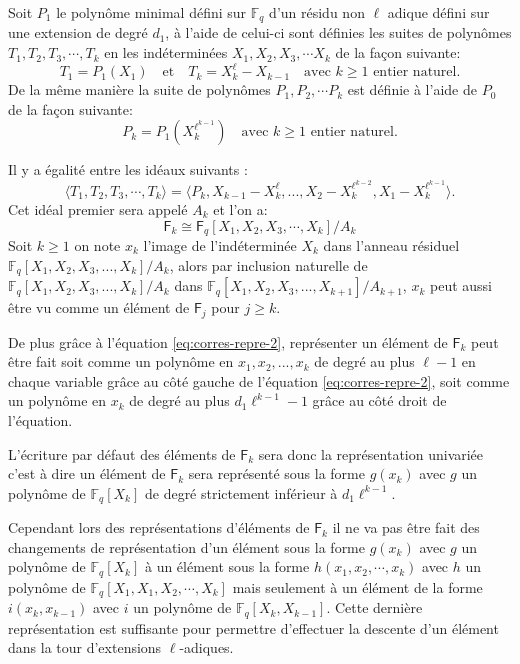 \documentclass[10pt,a4paper]{book}
\theoremstyle{plain}
\theoremstyle{definition}
\theoremstyle{definition}
\theoremstyle{definition}
\theoremstyle{definition}
\theoremstyle{definition}
\theoremstyle{remark}
\theoremstyle{remark}
\theoremstyle{definition}
\begin{document}
Soit $P_1$ le polynôme minimal défini sur $\mathbb{F}_q$ d'un résidu non $\ell$ adique défini sur une extension de degré $d_1$, à l'aide de celui-ci sont définies les suites de polynômes $T_1,T_2,T_3,\cdots, T_k$ en les indéterminées $X_1,X_2,X_3, \cdots X_k$ de la façon suivante:
\[
T_1=P_1(X_1) \quad \text{et} \quad T_k=X_k^{\ell}-X_{k-1} \quad \text{avec $k \geqslant 1$ entier naturel.}
\]  De la même manière la suite de polynômes $P_1,P_2, \cdots P_k$ est définie à l'aide de $P_0$ de la façon suivante:
\[
P_k=P_1(X_k^{\ell^{k-1}}) \quad \text{avec $k \geqslant 1$ entier naturel.} 
\]

Il y a égalité entre les idéaux suivants :
\begin{equation}
\label{eq:corres-repre-2}
\langle T_1, T_2, T_3, \cdots, T_k \rangle = \langle P_k, X_{k-1}-X_k^{\ell}, ..., X_2-X_{k}^{\ell^{k-2}}, X_1-X_k^{\ell^{k-1}} \rangle.
\end{equation}
Cet idéal premier sera appelé $A_k$ et l'on a:
\[
\mathsf{F}_k \cong \mathsf{F}_q[X_1,X_2,X_3,\cdots,X_k]/A_k
\]
Soit $k \geqslant 1$  on note $x_k$ l'image de l'indéterminée $X_k$ dans l'anneau résiduel $\mathbb{F}_q[X_1,X_2,X_3, ...,X_k]/A_k$, alors par inclusion naturelle de $\mathbb{F}_q[X_1,X_2,X_3, ...,X_k]/A_k$ dans $\mathbb{F}_q[X_1,X_2,X_3, ...,X_{k+1}]/A_{k+1}$, $x_k$ peut aussi être vu comme un élément de $\mathsf{F}_{j}$ pour $j \geqslant k$.

De plus grâce à l'équation \eqref{eq:corres-repre-2}, représenter un élément de $\mathsf{F}_k$ peut être fait soit comme un polynôme en $x_1,x_2, ..., x_k$ de degré au plus $\ell-1$ en chaque variable grâce au côté gauche de l'équation \eqref{eq:corres-repre-2}, soit comme un polynôme en $x_k$ de degré au plus $d_1\ell^{k-1}-1$ grâce au côté droit de l'équation.

L'écriture par défaut des éléments de $\mathsf{F}_k$ sera donc la représentation univariée c'est à dire un élément de $\mathsf{F}_k$ sera représenté sous la forme $g(x_k)$ avec $g$ un polynôme de $\mathbb{F}_q[X_k]$ de degré strictement inférieur à $d_1\ell^{k-1}$. 

Cependant lors des représentations d'éléments de $\mathsf{F}_k$ il ne va pas être fait des changements de représentation d'un élément sous la forme $g(x_k)$ avec $g$ un polynôme de $\mathbb{F}_q[X_k]$ à un élément sous la forme $h(x_1,x_2,\cdots,x_k)$ avec $h$ un polynôme de $\mathbb{F}_q[X_1,X_1,X_2,\cdots,X_k]$ mais seulement à un élément de la forme $i(x_k,x_{k-1})$ avec $i$ un polynôme de $\mathbb{F}_q[X_k,X_{k-1}]$. Cette dernière représentation est suffisante pour permettre d'effectuer la descente d'un élément dans la tour d'extensions $\ell$-adiques.
\end{document}
